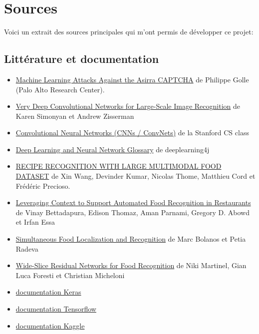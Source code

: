 \documentclass[a4paper,12pt]{report}
\begin{document}
    \newpage

    \section{Sources}
    Voici un extrait des sources principales qui m'ont permis de développer ce projet:

      \subsection{Littérature et documentation}
      \begin{itemize}
        \item \href{<http://xenon.stanford.edu/~pgolle/papers/dogcat.pdf>}{Machine Learning Attacks Against the Asirra CAPTCHA} de Philippe Golle (Palo Alto Research Center).
        \item \href{<https://arxiv.org/abs/1409.1556>}{Very Deep Convolutional Networks for Large-Scale Image Recognition} de Karen Simonyan et Andrew Zisserman
        \item \href{<https://cs231n.github.io/convolutional-networks/>}{Convolutional Neural Networks (CNNs / ConvNets)} de la Stanford CS class
        \item \href{<https://deeplearning4j.org/glossary>}{Deep Learning and Neural Network Glossary} de deeplearning4j
        \item \href{<http://webia.lip6.fr/~cord/pdfs/publis/CordCooking2015icme.pdf>}{RECIPE RECOGNITION WITH LARGE MULTIMODAL FOOD DATASET} de Xin Wang, Devinder Kumar, Nicolas Thome, Matthieu Cord et Frédéric Precioso.
        \item \href{<https://arxiv.org/pdf/1510.02078v1.pdf>}{Leveraging Context to Support Automated Food Recognition in Restaurants} de Vinay Bettadapura, Edison Thomaz, Aman Parnami, Gregory D. Abowd et Irfan Essa
        \item \href{<https://arxiv.org/pdf/1604.07953v2.pdf>}{Simultaneous Food Localization and Recognition} de Marc Bolanos et Petia Radeva
        \item \href{<https://arxiv.org/pdf/1612.06543v1.pdf>}{Wide-Slice Residual Networks for Food Recognition} de Niki Martinel, Gian Luca Foresti et Christian Micheloni
        \item \href{<https://keras.io/>}{documentation Keras}
        \item \href{<https://www.tensorflow.org/get\_started/get\_started>}{documentation Tensorflow}
        \item \href{<https://www.kaggle.com/wiki/Home>}{documentation Kaggle }
      \end{itemize}
\end{document}
